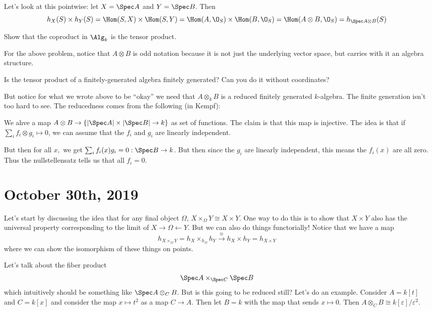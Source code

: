 \documentclass[12pt]{article}
\begin{document}
Let's look at this pointwise: let $X=\Spec A$ and $Y=\Spec B$. Then
\[h_X(S)\times h_Y(S)=\Hom(S,X)\times \Hom(S,Y)=\Hom(A,\O_S)\times\Hom(B,\O_S)=\Hom(A\otimes B,\O_S)=h_{\Spec A\otimes B}(S)\]
\begin{prob}
	Show that the coproduct in $\Alg_k$ is the tensor product.
\end{prob}
\begin{rmk}
	For the above problem, notice that $A\otimes B$ is odd notation because it is not just the underlying vector space, but carries with it 
	an algebra structure.
\end{rmk}
\begin{prob}
	Is the tensor product of a finitely-generated algebra finitely generated? Can you do it without coordinates?
\end{prob}

But notice for what we wrote above to be ``okay'' we need that $A\otimes_k B$ is a reduced finitely generated $k$-algebra. The finite generation 
isn't too hard to see. The reducedness comes from the following (in Kempf):

We ahve a map $A\otimes B\to \{|\Spec A|\times |\Spec B|\to k\}$ as set of functions. The claim is that this map is injective.
The idea is that if $\sum_i f_i\otimes g_i\mapsto 0$, we can assume that the $f_i$ and $g_i$ are linearly independent.

But then for all $x,$ we get $\sum_i f_i(x)g_i=0:\Spec B\to k$. But then since the $g_i$ are linearly independent,
this means the $f_i(x)$ are all zero. Thus the nullstellensatz tells us that all $f_i=0$.

\section{October 30th, 2019}
Let's start by discussing the idea that for any final object $\Omega$, $X\times_\Omega Y\cong X\times Y$. One way to do this 
is to show that $X\times Y$ also has the universal property corresponding to the limit of $X\to \Omega\leftarrow Y$. But we can 
also do things functorially! Notice that we have a map 
\[h_{X\times_\Omega Y}=h_X\times_{h_\Omega}h_Y\xrightarrow{\cong}h_X\times h_Y=h_{X\times Y}\]
where we can show the isomorphism of these things on points.

Let's talk about the fiber product 
\[\Spec A\times_{\Spec C}\Spec B\]
which intuitively should be something like $\Spec A\otimes_C B$. But is this going to be reduced still? Let's do an example. Consider $A=k[t]$ and $C=k[x]$ 
and consider the map $x\mapsto t^2$ as a map $C\to A$. Then let $B=k$ with the map that sends $x\mapsto 0$. Then $A\otimes_C B\cong k[\varepsilon]/\varepsilon^2$.
\end{document}
